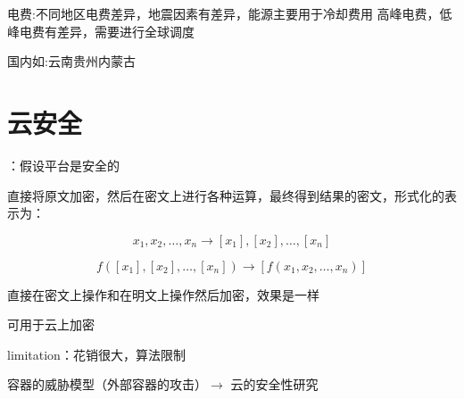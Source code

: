 电费:不同地区电费差异，地震️因素有差异，能源主要用于冷却费用
高峰电费，低峰电费有差异，需要进行全球调度

国内如:云南贵州内蒙古



\chapter{云安全}

：假设平台是安全的

\begin{definition}
    直接将原文加密，然后在密文上进行各种运算，最终得到结果的密文，形式化的表示为：

    \begin{equation} x_{1}, x_{2}, \ldots, x_{n} \rightarrow\left[x_{1}\right],\left[x_{2}\right], \ldots,\left[x_{n}\right] \end{equation}

    \begin{equation} f\left(\left[x_{1}\right],\left[x_{2}\right], \ldots,\left[x_{n}\right]\right) \rightarrow\left[f\left(x_{1}, x_{2}, \ldots, x_{n}\right)\right] \end{equation}
    
    直接在密文上操作和在明文上操作然后加密，效果是一样

    可用于云上加密

limitation：花销很大，算法限制
\end{definition}

容器的威胁模型（外部容器的攻击）$\rightarrow$ 云的安全性研究
